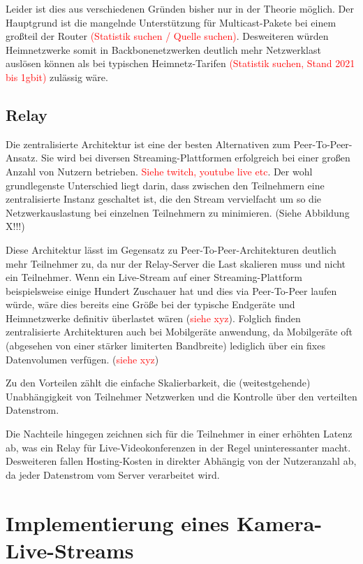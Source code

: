 \documentclass{article}
\begin{document}
\begin{onecolumn}
Leider ist dies aus verschiedenen Gründen bisher nur in der Theorie möglich.
Der Hauptgrund ist die mangelnde Unterstützung für Multicast-Pakete bei einem
großteil der Router \textcolor{red}{(Statistik suchen / Quelle suchen)}.
Desweiteren würden Heimnetzwerke somit in Backbonenetzwerken deutlich mehr
Netzwerklast auslösen können als bei typischen Heimnetz-Tarifen
\textcolor{red}{(Statistik suchen, Stand 2021 bis 1gbit)} zulässig wäre.

\subsection{Relay}

Die zentralisierte Architektur ist eine der besten Alternativen zum
Peer-To-Peer-Ansatz. Sie wird bei diversen Streaming-Plattformen erfolgreich
bei einer großen Anzahl von Nutzern betrieben. \textcolor{red}{Siehe twitch,
youtube live etc}. Der wohl grundlegenste Unterschied liegt darin, dass
zwischen den Teilnehmern eine zentralisierte Instanz geschaltet ist, die den
Stream vervielfacht um so die Netzwerkauslastung bei einzelnen Teilnehmern zu
minimieren. (Siehe Abbildung X!!!)


Diese Architektur lässt im Gegensatz zu Peer-To-Peer-Architekturen deutlich
mehr Teilnehmer zu, da nur der Relay-Server die Last skalieren muss und nicht
ein Teilnehmer. Wenn ein Live-Stream auf einer Streaming-Plattform
beispielsweise einige Hundert Zuschauer hat und dies via Peer-To-Peer laufen
würde, wäre dies bereits eine Größe bei der typische Endgeräte und
Heimnetzwerke definitiv überlastet wären (\textcolor{red}{siehe xyz}). Folglich
finden zentralisierte Architekturen auch bei Mobilgeräte anwendung, da
Mobilgeräte oft (abgesehen von einer stärker limiterten Bandbreite) lediglich
über ein fixes Datenvolumen verfügen. (\textcolor{red}{siehe xyz})

Zu den Vorteilen zählt die einfache Skalierbarkeit, die (weitestgehende)
Unabhängigkeit von Teilnehmer Netzwerken und die Kontrolle über den verteilten
Datenstrom.

Die Nachteile hingegen zeichnen sich für die Teilnehmer in einer erhöhten
Latenz ab, was ein Relay für Live-Videokonferenzen in der Regel uninteressanter
macht. Desweiteren fallen Hosting-Kosten in direkter Abhängig von der
Nutzeranzahl ab, da jeder Datenstrom vom Server verarbeitet wird.

\section{Implementierung eines Kamera-Live-Streams}


\end{onecolumn}
\end{document}
